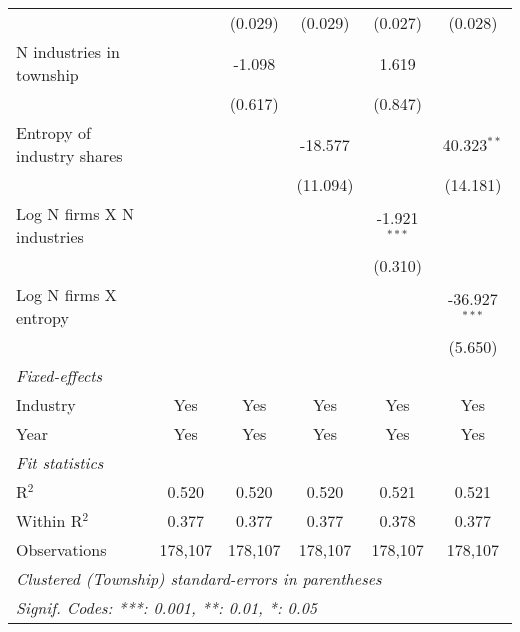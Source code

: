 \begin{tabular}{lccccc}
                                             &                  & (0.029)          & (0.029)          & (0.027)          & (0.028)\\   
   N industries in township                  &                  & -1.098           &                  & 1.619            &   \\   
                                             &                  & (0.617)          &                  & (0.847)          &   \\   
   Entropy of industry shares                &                  &                  & -18.577          &                  & 40.323$^{**}$\\   
                                             &                  &                  & (11.094)         &                  & (14.181)\\   
   Log N firms X N industries                &                  &                  &                  & -1.921$^{***}$   &   \\   
                                             &                  &                  &                  & (0.310)          &   \\   
   Log N firms X entropy                     &                  &                  &                  &                  & -36.927$^{***}$\\   
                                             &                  &                  &                  &                  & (5.650)\\   
   \midrule
   \emph{Fixed-effects}\\
   Industry                                  & Yes              & Yes              & Yes              & Yes              & Yes\\  
   Year                                      & Yes              & Yes              & Yes              & Yes              & Yes\\  
   \midrule
   \emph{Fit statistics}\\
   R$^2$                                     & 0.520            & 0.520            & 0.520            & 0.521            & 0.521\\  
   Within R$^2$                              & 0.377            & 0.377            & 0.377            & 0.378            & 0.377\\  
   Observations                              & 178,107          & 178,107          & 178,107          & 178,107          & 178,107\\  
   \midrule \midrule
   \multicolumn{6}{l}{\emph{Clustered (Township) standard-errors in parentheses}}\\
   \multicolumn{6}{l}{\emph{Signif. Codes: ***: 0.001, **: 0.01, *: 0.05}}\\
\end{tabular}
\par\endgroup
